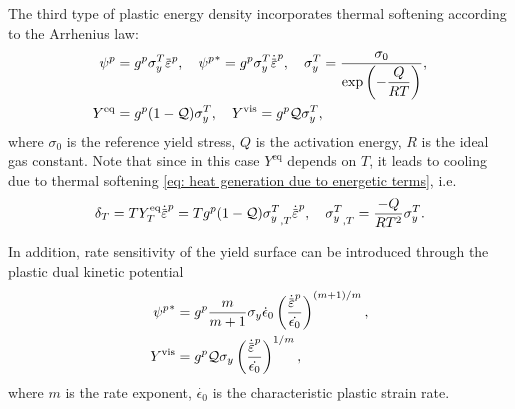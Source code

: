 The third type of plastic energy density incorporates thermal softening according to the Arrhenius law:
\begin{subequations}
  \begin{align}
    \psi^p      & = g^p \sigma_y^T \ep, \quad {\psi^p}^* = g^p \sigma_y^T \epdot, \quad \sigma_y^T = \dfrac{\sigma_0}{\exp\left( -\dfrac{Q}{RT} \right)}, \label{eq: temperature dependent flow stress} \\
    Y^\text{eq} & = g^p (1-\tqf) \sigma_y^T, \quad Y^\text{vis} = g^p \tqf \sigma_y^T,                                                                                                                  
  \end{align}
\end{subequations}
where $\sigma_0$ is the reference yield stress, $Q$ is the activation energy, $R$ is the ideal gas constant. Note that since in this case $Y^\text{eq}$ depends on $T$, it leads to cooling due to thermal softening \eqref{eq: heat generation due to energetic terms}, i.e.
\begin{align}
  \delta_T = TY^\text{eq}_T\epdot = T g^p (1-\tqf) {\sigma_y^T}_{,T}\epdot, \quad {\sigma_y^T}_{,T} = \dfrac{-Q}{RT^2} \sigma_y^T.
\end{align}


In addition, rate sensitivity of the yield surface can be introduced through the plastic dual kinetic potential
\begin{subequations}
  \begin{align}
    {\psi^p}^*   & = g^p \dfrac{m}{m+1} \sigma_y \dot{\epsilon}_0 \left( \dfrac{\epdot}{\dot{\epsilon_0}} \right)^{(m+1)/m}, \\
    Y^\text{vis} & = g^p \tqf \sigma_y \left( \dfrac{\epdot}{\dot{\epsilon_0}} \right)^{1/m},                                
  \end{align}
\end{subequations}
where $m$ is the rate exponent, $\dot{\epsilon_0}$ is the characteristic plastic strain rate.

